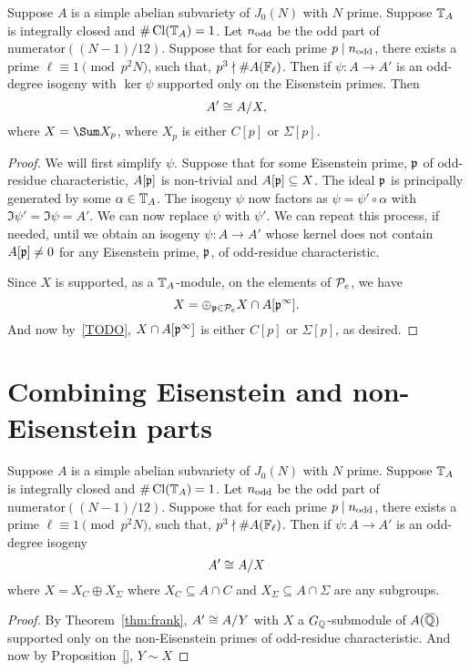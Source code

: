 \documentclass[thesis.tex]{subfiles}
\begin{document}
\begin{corollary}
    \label{cor:eisenstein}
    Suppose $A$ is a simple abelian subvariety of $J_0(N)$ with $N$ prime.
    Suppose $\TT_A$ is integrally closed and $\#\Cl(\TT_A)=1$. Let $n_\odd$ be
    the odd part of $\mathrm{numerator}((N-1)/12)$. Suppose that for each prime
    $p\mid n_\odd$, there exists a prime $\ell\equiv 1 \pmod{p^2N}$, such that,
    $p^3\nmid \#A(\F_\ell)$. Then if $\psi:A\to A'$ is an odd-degree isogeny
    with $\ker\psi$ supported only on the Eisenstein primes. Then
    \[
        A'\isom A/X,
    \]
    where $X=\Sum X_p$, where $X_p$ is either $C[p]$ or $\Sigma[p]$.
\end{corollary}
\begin{proof}
    We will first simplify $\psi$. Suppose that for some Eisenstein prime, $\p$
    of odd-residue characteristic, $A[\p]$ is non-trivial and $A[\p]\subseteq
    X$. The ideal $\p$ is principally generated by some $\alpha\in \TT_A$. The
    isogeny $\psi$ now factors as $\psi=\psi'\circ \alpha$ with $\Im \psi'=\Im
    \psi = A'$. We can now replace $\psi$ with $\psi'$. We can repeat this
    process, if needed, until we obtain an isogeny $\psi:A\to A'$ whose kernel
    does not contain $A[\p]\neq 0$ for any Eisenstein prime, $\p$, of odd-residue
    characteristic.

    Since $X$ is supported, as a $\TT_A$-module, on the elements of $\P_e$, we
    have
    \[
        X = \oplus_{\p\in \P_e} X\cap A[\p^\infty].
    \]
    And now by~\ref{TODO}, $X\cap A[\p^\infty]$ is either $C[p]$ or
    $\Sigma[p]$, as desired.
\end{proof}


\section{Combining Eisenstein and non-Eisenstein parts}%
\label{sec:combining_eisenstein_and_non_eisenstein_parts}

\begin{theorem}
    Suppose $A$ is a simple abelian subvariety of $J_0(N)$ with $N$ prime.
    Suppose $\TT_A$ is integrally closed and $\#\Cl(\TT_A)=1$. Let $n_\odd$ be
    the odd part of $\mathrm{numerator}((N-1)/12)$. Suppose that for each prime
    $p\mid n_\odd$, there exists a prime $\ell\equiv 1 \pmod{p^2N}$, such that,
    $p^3\nmid \#A(\F_\ell)$. Then if $\psi:A\to A'$ is an odd-degree isogeny
    \[
        A'\isom A/X
    \]
    where $X=X_C\oplus X_\Sigma$ where $X_C\subseteq A\cap C$ and $X_\Sigma
    \subseteq A\cap \Sigma$ are any subgroups.
\end{theorem}
\begin{proof}
    By Theorem~\ref{thm:frank}, $A'\isom A/Y$ with $X$ a $G_\QQ$-submodule of
    $A(\QQbar)$ supported only on the non-Eisenstein primes of odd-residue
    characteristic. And now by Proposition~\ref{}, $Y\sim X$
\end{proof}
\end{document}
